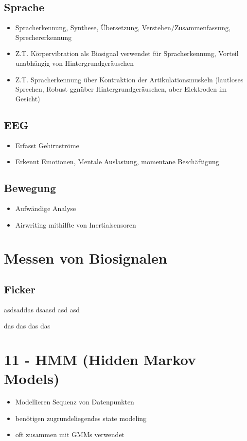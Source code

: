 \documentclass[a4paper,10pt,oneside]{article}
\begin{document}
\subsection{Sprache}
\begin{itemize}
	\item Spracherkennung, Synthese, Übersetzung, Verstehen/Zusammenfassung, Sprechererkennung
	\item Z.T. Körpervibration als Biosignal verwendet für Spracherkennung, Vorteil unabhängig von Hintergrundgeräuschen
	\item Z.T. Spracherkennung über Kontraktion der Artikulationsmuskeln (lautloses Sprechen, Robust ggnüber Hintergrundgeräuschen, aber Elektroden im Gesicht)
\end{itemize}

\subsection{EEG}
\begin{itemize}
	\item Erfasst Gehirnströme
	\item Erkennt Emotionen, Mentale Auslastung, momentane Beschäftigung
\end{itemize}

\subsection{Bewegung}
\begin{itemize}
	\item Aufwändige Analyse
	\item Airwriting mithilfte von Inertialsensoren
\end{itemize}

\section{Messen von Biosignalen}
\subsection{Ficker}
asdsaddas
dsaasd
asd
asd

das
das
das
das


\section{11 - HMM (Hidden Markov Models)}
	\begin{itemize}
		\item Modellieren Sequenz von Datenpunkten
		\item benötigen zugrundeliegendes state modeling
		\item oft zusammen mit GMMs verwendet
	\end{itemize}
	
\end{document}
